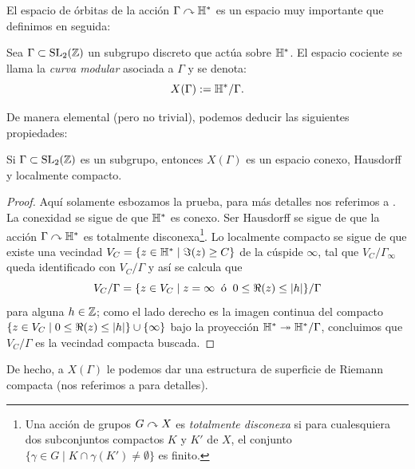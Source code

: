 \documentclass[../../tesis_maestria]{subfiles}
\begin{document}
El espacio de \'orbitas de la acci\'on $\Gamma\curvearrowright\mathbb{H}^*$ es un espacio muy importante que definimos
en seguida:

\begin{defin}\label{def:curva_modular}
  Sea $\Gamma\subset\mathrm{SL}_2(\mathbb{Z})$ un subgrupo discreto que act\'ua sobre $\mathbb{H}^*$. El espacio cociente
  se llama la \emph{curva modular} asociada a $\Gamma$ y se denota:
  \[
    X(\Gamma):=\mathbb{H}^*/\Gamma.
  \]
\end{defin}

De manera elemental (pero no trivial), podemos deducir las siguientes propiedades:

\begin{prop}\label{prop:de_curva_modular}
  Si $\Gamma\subset\mathrm{SL}_2(\mathbb{Z})$ es un subgrupo, entonces $X(\Gamma)$ es un espacio
  conexo, Hausdorff y localmente compacto.
\end{prop}

\begin{proof}
  Aqu\'i solamente esbozamos la prueba, para m\'as detalles nos referimos a
  \cite[\S1.3, teorema 1.28 y proposici\'on 1.29 respectivamente]{ShimuraITTATOAF}. La conexidad
  se sigue de que $\mathbb{H}^*$ es conexo. Ser Hausdorff se sigue de que la acci\'on $\Gamma\curvearrowright\mathbb{H}^*$
  es totalmente disconexa\footnote{Una acci\'on de grupos $G\curvearrowright X$ es \emph{totalmente disconexa}
    si para cualesquiera dos subconjuntos compactos $K$ y $K'$ de $X$, el conjunto
    $\{\gamma\in G\mid K\cap \gamma(K')\neq\emptyset\}$ es finito.}.
  Lo localmente compacto se sigue de que existe una vecindad $V_C=\{z\in\mathbb{H}^*\mid\Im(z)\geq C\}$ de
  la c\'uspide $\infty$, tal que $V_C/\Gamma_{\infty}$ queda identificado con $V_C/\Gamma$ y as\'i
  se calcula que
  \[
    V_C/\Gamma=\{z\in V_C\mid z=\infty \;\;\text{\'o}\;\;0\leq\Re(z)\leq\left| h \right|\}/\Gamma
  \]
  para alguna $h\in\mathbb{Z}$; como el lado derecho es la imagen continua del compacto
  $\{z\in V_C\mid 0\leq\Re(z)\leq\left| h \right|\}\cup\{\infty\}$ bajo la proyecci\'on
  $\mathbb{H}^*\twoheadrightarrow\mathbb{H}^*/\Gamma$, concluimos que $V_C/\Gamma$ es la vecindad compacta buscada.
\end{proof}

De hecho, a $X(\Gamma)$ le podemos dar una estructura de superficie
de Riemann compacta (nos referimos a \cite[\S2.2, \S2.3, \S2.4]{DiamondShurmanAFCIMF}
para detalles).
\end{document}
